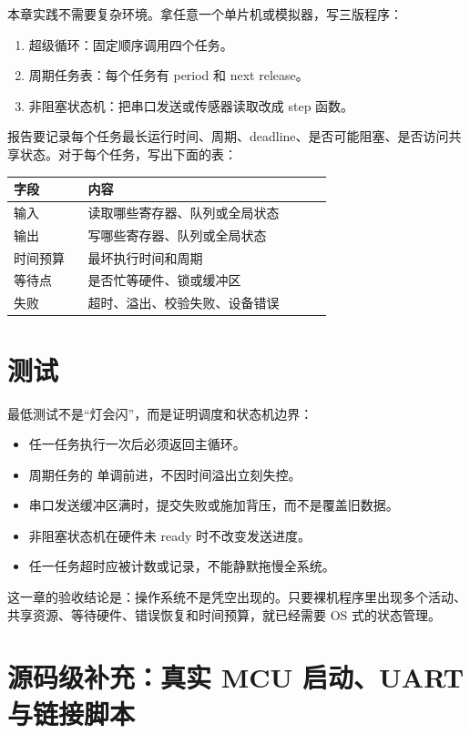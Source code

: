 本章实践不需要复杂环境。拿任意一个单片机或模拟器，写三版程序：

\begin{enumerate}
\tightlist
\item 超级循环：固定顺序调用四个任务。
\item 周期任务表：每个任务有 period 和 next release。
\item 非阻塞状态机：把串口发送或传感器读取改成 step 函数。
\end{enumerate}

报告要记录每个任务最长运行时间、周期、deadline、是否可能阻塞、是否访问共享状态。对于每个任务，写出下面的表：

\begin{longtable}{p{0.2\linewidth}p{0.66\linewidth}}
\toprule
字段 & 内容 \\
\midrule
输入 & 读取哪些寄存器、队列或全局状态 \\
输出 & 写哪些寄存器、队列或全局状态 \\
时间预算 & 最坏执行时间和周期 \\
等待点 & 是否忙等硬件、锁或缓冲区 \\
失败 & 超时、溢出、校验失败、设备错误 \\
\bottomrule
\end{longtable}

\section{测试}

最低测试不是“灯会闪”，而是证明调度和状态机边界：

\begin{itemize}
\tightlist
\item 任一任务执行一次后必须返回主循环。
\item 周期任务的  单调前进，不因时间溢出立刻失控。
\item 串口发送缓冲区满时，提交失败或施加背压，而不是覆盖旧数据。
\item 非阻塞状态机在硬件未 ready 时不改变发送进度。
\item 任一任务超时应被计数或记录，不能静默拖慢全系统。
\end{itemize}

这一章的验收结论是：操作系统不是凭空出现的。只要裸机程序里出现多个活动、共享资源、等待硬件、错误恢复和时间预算，就已经需要 OS 式的状态管理。

\section{源码级补充：真实 MCU 启动、UART 与链接脚本}

